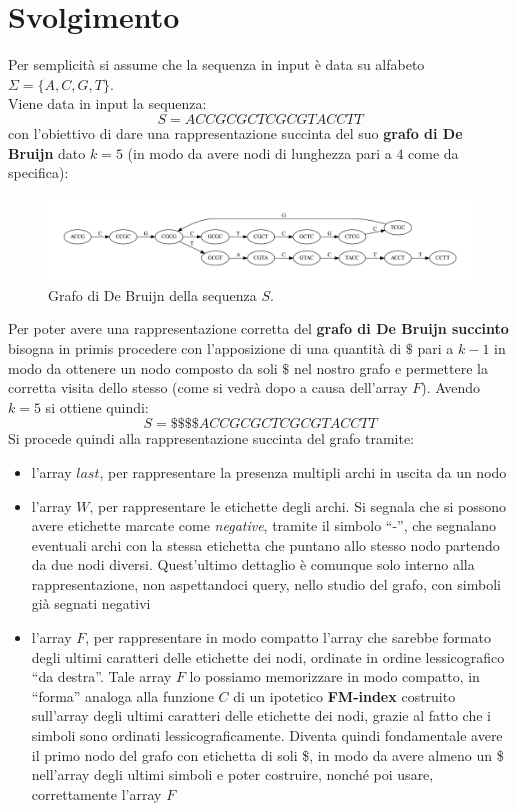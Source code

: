 \documentclass[a4paper,12pt, oneside]{book}
\begin{document}
\section{Svolgimento}
Per semplicità si assume che la sequenza in input è data su alfabeto
$\Sigma=\{A,C,G,T\}$.\\
Viene data in input la sequenza:
\[S=ACCGCGCTCGCGTACCTT\]
con l'obiettivo di dare una rappresentazione succinta del suo \textbf{grafo di
  De Bruijn} dato $k=5$ (in modo da avere nodi di lunghezza pari a $4$ come da
specifica): 
\begin{figure}[H]
  \centering
  \includegraphics[width = \textwidth]{img/assign3nd.pdf}
  \caption{Grafo di De Bruijn della sequenza $S$.}
\end{figure}
Per poter avere una rappresentazione corretta del \textbf{grafo di De Bruijn
  succinto} bisogna in primis procedere con l'apposizione di una quantità di
$\$$ pari a $k-1$ in modo da ottenere un nodo composto da soli $\$$ nel nostro
grafo e permettere la corretta visita dello stesso (come si vedrà dopo a causa
dell'array $F$). Avendo $k=5$ si ottiene quindi:
\[S=\$\$\$\$ACCGCGCTCGCGTACCTT\]
\newpage
Si procede quindi alla rappresentazione succinta del grafo tramite:
\begin{itemize}
  \item l'array $last$, per rappresentare la presenza multipli archi in uscita
  da un nodo 
  \item l'array $W$, per rappresentare le etichette degli archi. Si segnala che
  si possono avere etichette marcate come
  \textit{negative}, tramite il simbolo ``-'', che segnalano eventuali archi con
  la stessa etichetta che puntano allo stesso nodo partendo da due nodi
  diversi. Quest'ultimo dettaglio è comunque solo interno alla rappresentazione,
  non aspettandoci query, nello studio del grafo, con simboli già segnati
  negativi
  \item l'array $F$, per rappresentare in modo compatto l'array che sarebbe
  formato degli ultimi caratteri delle etichette dei nodi, ordinate in ordine
  lessicografico ``da destra''. Tale array $F$ lo possiamo memorizzare in modo
  compatto, in ``forma'' analoga alla
  funzione $C$ di un ipotetico \textbf{FM-index} costruito sull'array degli
  ultimi caratteri delle etichette dei nodi, grazie al fatto che i simboli sono
  ordinati lessicograficamente. Diventa quindi fondamentale avere
  il primo nodo del grafo con etichetta di soli \$, in modo da avere almeno un
  \$ nell'array degli ultimi simboli e poter costruire, nonché poi usare,
  correttamente l'array $F$ 
\end{itemize}
\end{document}
